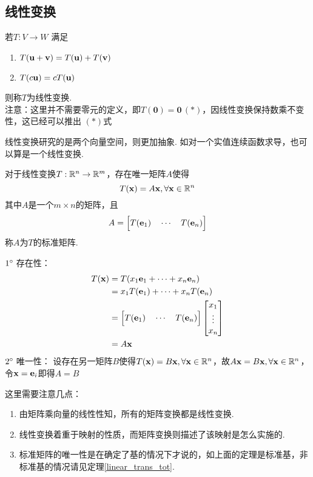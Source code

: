 \subsection{线性变换}
\begin{definition}
若$T:V\to W$ 满足
\begin{enumerate}
	\itemsep -3pt
	\item $T(\mathbf{u}+\mathbf{v})=T(\mathbf{u})+T(\mathbf{v})$
	\item $T(c\mathbf{u})=cT(\mathbf{u})$
\end{enumerate}
则称$T$为线性变换.\\
注意：这里并不需要零元的定义，即$T(\mathbf{0})=\mathbf{0}\,(*)$，因线性变换保持数乘不变性，这已经可以推出 $(*)$式
\end{definition}
\par 线性变换研究的是两个向量空间，则更加抽象. 如对一个实值连续函数求导，也可以算是一个线性变换.
\begin{theorem}[标准(standard)矩阵]
对于线性变换$T:\mathbb{R}^n\to\mathbb{R}^m$，存在唯一矩阵$A$使得
\[T(\mathbf{x})=A\mathbf{x},\forall\mathbf{x}\in\mathbb{R}^n\]
其中$A$是一个$m\times n$的矩阵，且
\[A=\Big[T(\mathbf{e}_1)\quad\cdots\quad T(\mathbf{e}_n)\Big]\]
称$A$为$T$的标准矩阵.
\end{theorem}
\begin{analysis}
$1\degree\;$存在性：
\[\begin{aligned}T(\mathbf{x}) &= T(x_1\mathbf{e}_1+\cdots+x_n\mathbf{e}_n)\\
&= x_1T(\mathbf{e}_1)+\cdots+x_nT(\mathbf{e}_n)\\
&= \Big[T(\mathbf{e}_1)\quad\cdots\quad T(\mathbf{e}_n)\Big]\begin{bmatrix}x_1\\\vdots\\x_n\end{bmatrix}\\
&= A\mathbf{x}
\end{aligned}\]
$2\degree\;$唯一性：
设存在另一矩阵$B$使得$T(\mathbf{x})=B\mathbf{x},\forall\mathbf{x}\in\mathbb{R}^n$，故$A\mathbf{x}=B\mathbf{x},\forall\mathbf{x}\in\mathbb{R}^n$，令$\mathbf{x}=\mathbf{e}_i$即得$A=B$
\end{analysis}
这里需要注意几点：
\begin{enumerate}
	\itemsep -3pt
	\item 由矩阵乘向量的线性性知，所有的矩阵变换都是线性变换.
	\item 线性变换着重于映射的性质，而矩阵变换则描述了该映射是怎么实施的.
	\item 标准矩阵的唯一性是在确定了基的情况下才说的，如上面的定理是标准基，非标准基的情况请见定理\ref{linear_trans_tot}.
\end{enumerate}
